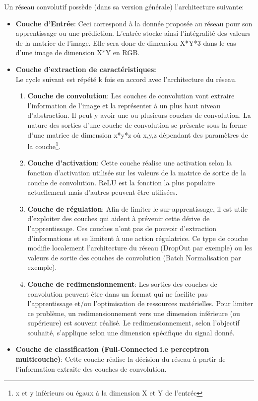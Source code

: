 \noindent Un réseau convolutif possède (dans sa version générale) l'architecture suivante:
\begin{itemize}
    \item \textbf{Couche d'Entrée}: Ceci correspond à la donnée proposée au réseau pour son apprentissage ou une prédiction. L'entrée stocke ainsi l'intégralité des valeurs de la matrice de l'image. Elle sera donc de dimension X*Y*3 dans le cas d'une image de dimension X*Y en RGB.
    \item \textbf{Couche d'extraction de caractéristiques:}\\

    Le cycle suivant est répété k fois en accord avec l'architecture du réseau.
    \begin{enumerate}

    \item \textbf{Couche de convolution}: Les couches de convolution vont extraire l'information de l'image et la représenter à un plus haut niveau d'abstraction. Il peut y avoir une ou plusieurs couches de convolution. La nature des sorties d'une couche de convolution se présente sous la forme d'une matrice de dimension x*y*z où x,y,z dépendant des paramètres de la couche\footnote{x et y inférieurs ou égaux à la dimension X et Y de l'entrée}.

    \item \textbf{Couche d'activation}: Cette couche réalise une activation selon la fonction d'activation utilisée sur les valeurs de la matrice de sortie de la couche de convolution. ReLU est la fonction la plus populaire actuellement mais d'autres peuvent être utilisées.

    \item \textbf{Couche de régulation}: Afin de limiter le sur-apprentissage, il est utile d'exploiter des couches qui aident à prévenir cette dérive de l'apprentissage. Ces couches n'ont pas de pouvoir d'extraction d'informations et se limitent à une action régulatrice. Ce type de couche modifie localement l'architecture du réseau (DropOut par exemple) ou les valeurs de sortie des couches de convolution (Batch Normalisation par exemple).

    \item \textbf{Couche de redimensionnement}: Les sorties des couches de convolution peuvent être dans un format qui ne facilite pas l'apprentissage et/ou l'optimisation de ressources matérielles. Pour limiter ce problème, un redimensionnement vers une dimension inférieure (ou supérieure) est souvent réalisé. Le redimensionnement, selon l'objectif souhaité, s'applique selon une dimension spécifique du signal donné.
    \end{enumerate}

    \item \textbf{Couche de classification (Full-Connected i.e perceptron multicouche)}: Cette couche réalise la décision du réseau à partir de l'information extraite des couches de convolution.
\end{itemize}


